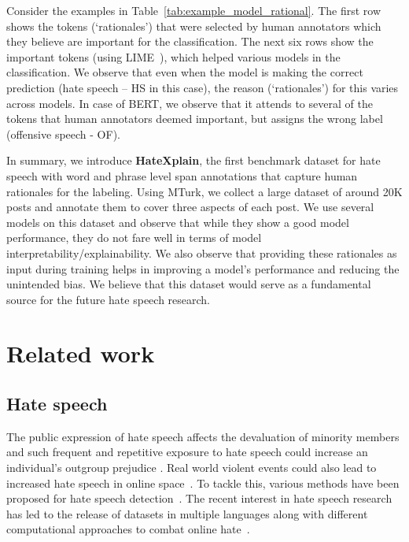 \documentclass[letterpaper]{article} \usepackage{aaai21}  \usepackage{times}  \usepackage{helvet} \usepackage{courier}  \usepackage[hyphens]{url}  \usepackage{graphicx} \urlstyle{rm} \def\UrlFont{\rm}  \usepackage{natbib}  \usepackage{caption}
\begin{document}
Consider the examples in Table~\ref{tab:example_model_rational}. The first row shows the tokens (`rationales') that were selected by human annotators which they believe are important for the classification. The next six rows show the important tokens (using LIME~\cite{ribeiro2016should}), which helped
various models in the classification. We observe that even when the model is making the correct prediction (hate speech -- HS in this case), the reason (`rationales') for this varies across models. In case of BERT, we observe that it attends to several of the tokens that human annotators deemed important, but assigns the wrong label (offensive speech - OF).


In summary, we introduce {\bf{HateXplain}}, the first benchmark dataset for hate speech with word and phrase level span annotations that capture human rationales for the labeling. Using MTurk, we collect a large dataset of around 20K posts and annotate them to cover three aspects of each post. We use several models on this dataset and observe that while they show a good model performance, they do not fare well in terms of model interpretability/explainability. We also observe that providing these rationales as input during training helps in improving a model's performance and reducing the unintended bias. We believe that this dataset would serve as a fundamental source for the future hate speech research.

\section{Related work}

\subsection{Hate speech}
The public expression of hate speech affects the devaluation of minority members \cite{greenberg1985effect} and such frequent and repetitive exposure to hate speech could increase an individual's outgroup prejudice \cite{soral2018exposure}. Real world violent events could also lead to increased hate speech in online space~\cite{DBLP:conf/icwsm/Olteanu0BV18}. To tackle this, various methods have been proposed for hate speech detection~\cite{burnap2016us,ribeiro2018characterizing,zhang2018detecting,qian2018hierarchical}.
The recent interest in hate speech research has led to the release of datasets in multiple languages \cite{ousidhoum2019multilingual,sanguinetti2018italian} along with different computational approaches to combat online hate~\cite{qian2019benchmark,mathew2019thou,aluru2020deep}. 
\end{document}
